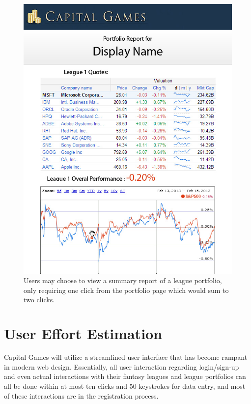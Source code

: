 {
\begin{figure}
\centering
\includegraphics[width=5.5in]{./mockups/JPEG/Report.jpg}
\caption{Users may choose to view a summary report of a league portfolio, only requiring one click from the portfolio page which would sum to two clicks.}
\end{figure}
}

\section{User Effort Estimation}

Capital Games will utilize a streamlined user interface that has become rampant in modern web design. Essentially, all user interaction regarding login/sign-up and even actual interactions with their fantasy leagues and league portfolios can all be done within at most ten clicks and 50 keystrokes for data entry, and most of these interactions are in the registration process.


